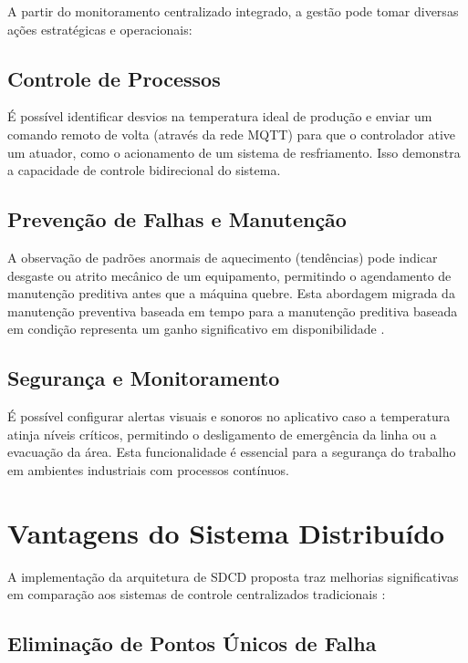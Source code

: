 \documentclass[12pt,a4paper,oneside]{article}
\begin{document}
A partir do monitoramento centralizado integrado, a gestão pode tomar diversas ações estratégicas e operacionais:

\subsection{Controle de Processos}

É possível identificar desvios na temperatura ideal de produção e enviar um comando remoto de volta (através da rede MQTT) para que o controlador ative um atuador, como o acionamento de um sistema de resfriamento. Isso demonstra a capacidade de controle bidirecional do sistema.

\subsection{Prevenção de Falhas e Manutenção}

A observação de padrões anormais de aquecimento (tendências) pode indicar desgaste ou atrito mecânico de um equipamento, permitindo o agendamento de manutenção preditiva antes que a máquina quebre. Esta abordagem migrada da manutenção preventiva baseada em tempo para a manutenção preditiva baseada em condição representa um ganho significativo em disponibilidade \cite{santos2024}.

\subsection{Segurança e Monitoramento}

É possível configurar alertas visuais e sonoros no aplicativo caso a temperatura atinja níveis críticos, permitindo o desligamento de emergência da linha ou a evacuação da área. Esta funcionalidade é essencial para a segurança do trabalho em ambientes industriais com processos contínuos.

\section{Vantagens do Sistema Distribuído}

A implementação da arquitetura de SDCD proposta traz melhorias significativas em comparação aos sistemas de controle centralizados tradicionais \cite{caiçara2015}:

\subsection{Eliminação de Pontos Únicos de Falha}
\end{document}
